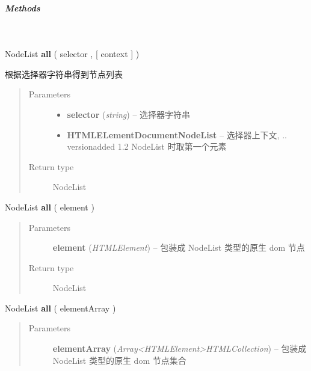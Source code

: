 \documentclass[letterpaper,10pt,english]{sphinxmanual}
\begin{document}
\subparagraph{Methods}
\label{api/core/node/all:methods}

\begin{fulllineitems}
\label{api/core/node/all:Node.all}~
\begin{DUlineblock}{0em}
\item[] NodeList \textbf{all} ( selector , {[} context {]} )
\item[] 根据选择器字符串得到节点列表
\end{DUlineblock}
\begin{quote}\begin{description}
\item[{Parameters}] \leavevmode\begin{itemize}
\item {}
\textbf{selector} (\emph{string}) -- 选择器字符串

\item {}
\textbf{HTMLELement\textbar{}Document\textbar{}NodeList} -- 选择器上下文, .. versionadded 1.2 NodeList 时取第一个元素

\end{itemize}

\item[{Return type}] \leavevmode
NodeList

\end{description}\end{quote}

\begin{DUlineblock}{0em}
\item[] NodeList \textbf{all}  ( element )
\end{DUlineblock}
\begin{quote}\begin{description}
\item[{Parameters}] \leavevmode
\textbf{element} (\emph{HTMLElement}) -- 包装成 NodeList 类型的原生 dom 节点

\item[{Return type}] \leavevmode
NodeList

\end{description}\end{quote}

\begin{DUlineblock}{0em}
\item[] NodeList \textbf{all}  ( elementArray )
\end{DUlineblock}
\begin{quote}\begin{description}
\item[{Parameters}] \leavevmode
\textbf{elementArray} (\emph{Array\textless{}HTMLElement\textgreater{}\textbar{}HTMLCollection}) -- 包装成 NodeList 类型的原生 dom 节点集合


\end{description}
\end{quote}
\end{fulllineitems}
\end{document}
